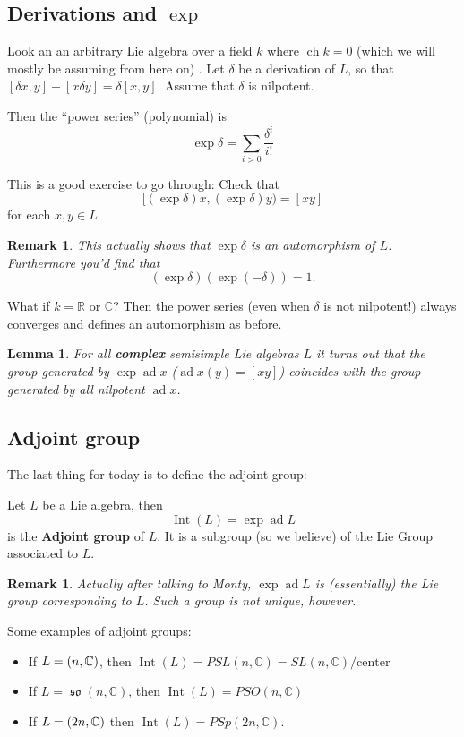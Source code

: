 \documentclass[12pt]{article}
\theoremstyle{nonumberbreak}
\theoremstyle{changebreak}
\newtheorem{lem}[thm]{Lemma}
\theoremstyle{nonumberbreak}
\theoremstyle{change}
\newtheorem{rmk}[thm]{Remark}
\newcommand*{\R}{
\mathbb{R}
}
\newcommand*{\C}{
\mathbb{C}
}
\DeclareMathOperator{\ch}{ch}
\let\sl\relax
\DeclareMathOperator{\sl}{\mathfrak{sl}}
\DeclareMathOperator{\so}{\mathfrak{so}}
\let\sp\relax
\DeclareMathOperator{\sp}{\mathfrak{sp}}
\DeclareMathOperator{\ad}{ad}
\begin{document}
\subsection{Derivations and $\exp$}
Look an an arbitrary Lie algebra over a field $k$ where $\ch k=0$ (which we will mostly be assuming from here on)
. Let $\delta$ be a derivation of $L$, so that $[\delta x,y]+[x\delta y]=\delta[x,y]$. Assume that $\delta$ is nilpotent.

Then the ``power series'' (polynomial) is
\[\exp\delta=\sum_{i>0}\frac{\delta^i}{i!}\]
\begin{prob}
	This is a good exercise to go through: Check that
	\[[(\exp\delta)x,(\exp \delta)y)=[xy]\]
	for each $x,y\in L$
\end{prob}

\begin{rmk}
	This actually shows that $\exp\delta$ is an automorphism of $L$. Furthermore you'd find that
	\[(\exp\delta)(\exp(-\delta))=1.\]
\end{rmk}

What if $k=\R$ or $\C$? Then the power series (even when $\delta$ is not nilpotent!) always converges
and defines an automorphism as before.

\begin{lem}
	For all \textbf{complex} semisimple Lie algebras $L$ it turns out that the group
	generated by $\exp\ad x$ ($\ad x(y)=[xy]$) coincides with the group generated by all 
	nilpotent $\ad x$.
\end{lem}
\subsection{Adjoint group}
The last thing for today is to define the adjoint group:
\begin{defn}
	Let $L$ be a Lie algebra, then 
	\[\operatorname{Int}(L)=\exp\ad L\]
	is the \textbf{Adjoint group} of $L$. It is a subgroup (so we believe) of the Lie
	Group associated to $L$.
\end{defn}
\begin{rmk}
	Actually after talking to Monty, $\exp\ad L$ \textit{is} (essentially) the Lie group
	corresponding to $L$. Such a group is not unique, however.
\end{rmk}

Some examples of adjoint groups:
\begin{itemize}
	\item If $L=\sl(n,\C)$, then $\operatorname{Int}(L)=PSL(n,\C)=SL(n,\C)/\text{center}$
	\item If $L=\so(n,\C)$, then $\operatorname{Int}(L)=PSO(n,\C)$
	\item If $L=\sp(2n,\C)$ then $\operatorname{Int}(L)=PSp(2n,\C)$.
\end{itemize}
\end{document}
